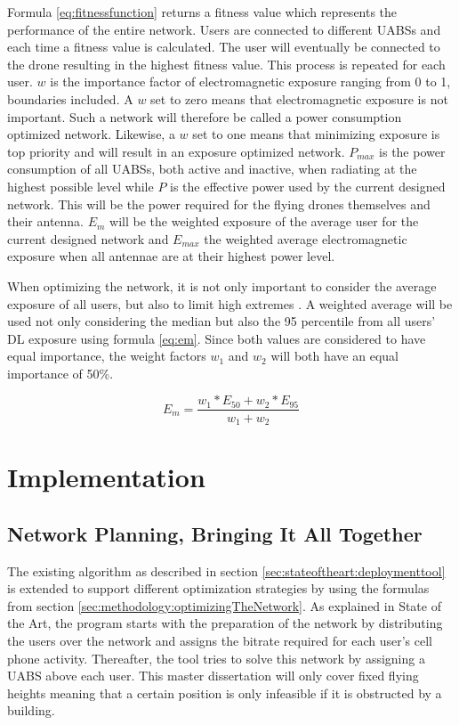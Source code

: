 Formula \ref{eq:fitnessfunction} returns a fitness value which represents the performance of the entire network. Users are connected to different \gls{UABS}s and each time a fitness value is 
calculated. The user will eventually be connected to the drone resulting in the highest fitness value. This process is repeated for each user.
$w$ is the importance factor of electromagnetic exposure ranging from 0 to 1, boundaries included. A $w$ set to zero means that electromagnetic 
exposure is not important. Such a network will therefore be called a power consumption optimized network. 
Likewise, a $w$ set to one means that minimizing exposure is top priority and will result in an exposure optimized 
network. $P_{max}$ is the power consumption of all \gls{UABS}s, both active and inactive, when radiating at the highest possible level 
while $P$ is the effective power used by the current designed network. 
This will be the power required for the flying drones themselves and their antenna.
$E_m$ will be the weighted exposure of the average user for the current designed network and $E_{max}$ the weighted average electromagnetic exposure when all antennae are at their highest power level.

When optimizing the network, it is not only important to consider the average exposure of all users, but also to limit high extremes \cite{J1}. A weighted average 
will be used not only considering the median but also the 95 percentile from all users' \gls{DL} exposure using formula \ref{eq:em}. 
Since both values are considered to have equal importance, the weight factors $w_1$ and $w_2$ will both have an equal importance of 50\%. 

\begin{equation} 
E_m = \frac{w_1 * E_{50} + w_2 * E_{95}}{w_1 + w_2}
\label{eq:em}
\end{equation}


\section{Implementation}

\subsection{Network Planning, Bringing It All Together}

The existing algorithm as described in section \ref{sec:stateoftheart:deploymenttool} is extended to support different optimization strategies by 
using the formulas from section \ref{sec:methodology:optimizingTheNetwork}.
As explained in State of the Art, the program starts with the preparation of the network by distributing the users over the network and assigns 
the bitrate required for each user's cell phone activity.
Thereafter, the tool tries to solve  this network by assigning a \gls{UABS} above each user. This master dissertation will only cover fixed flying heights meaning that a 
certain position is only infeasible if it is obstructed by a building.

